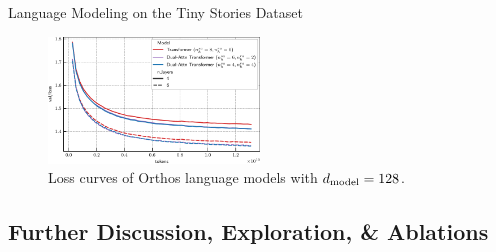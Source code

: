 \begin{table}
    \caption{Language Modeling on the Tiny Stories Dataset}\label{tab:tiny_stories_results}
    
\end{table}

\begin{figure}
    \centering
    \includegraphics[width=0.5\textwidth]{figs/experiments/tiny_stories/d128L4L6_symattn_asymra.pdf}
    \caption{Loss curves of Orthos language models with $d_{\mathrm{model}} = 128$.}\label{fig:tiny_stories_val_loss_curves_d128}
\end{figure}

\subsection*{Further Discussion, Exploration, \& Ablations}

